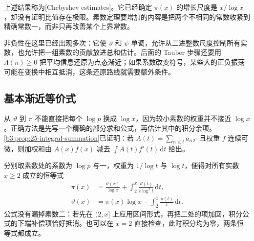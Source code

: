 上述结果称为[Chebyshev estimates]。它已经确定 \(\pi(x)\) 的增长尺度是 \(x/\log x\)，却没有证明比值存在极限。素数定理要增加的内容是把两个不相同的常数收紧到精确常数一，而非只再改善某个上界常数。

\ProseParagraphBreak

非负性在这里已经出现多次：它使 \(\vartheta\) 和 \(\psi\) 单调，允许从二进整数尺度控制所有实数，也允许把一组素数的贡献放进总和估计。后面的 Tauber 步骤还要用 \(\Lambda(n)\ge0\) 把平均信息还原为点态渐近；如果系数改变符号，某些大的正负振荡可能在变换中相互抵消，这条还原路线就需要额外条件。

\subsection{基本渐近等价式}
\label{b3:subsec:270105}

从 \(\vartheta\) 到 \(\pi\) 不能直接把每个 \(\log p\) 换成 \(\log x\)，因为较小素数的权重并不接近 \(\log x\)。正确方法是先写一个精确的部分求和公式，再估计其中的积分余项。\cref{b3:prop:25-integral-summation}已证明：若 \(A(t)=\sum_{n\le t}a_n\)，且权重 \(f\) 连续可微，则加权和由 \(A(x)f(x)\) 减去 \(\int A(t)f'(t)\,\mathrm dt\) 给出。

\ProseParagraphBreak

分别取素数处的系数为 \(\log p\) 与一，权重为 \(1/\log t\) 与 \(\log t\)，便得对所有实数 \(x\ge2\) 成立的恒等式
\begin{equation}\label{b3:eq:27-count-partial-summation}
 \begin{aligned}
  \pi(x)&=\frac{\vartheta(x)}{\log x}
       +\int_2^x\frac{\vartheta(t)}{t\log^2t}\,\mathrm dt,\\
  \vartheta(x)&=\pi(x)\log x
       -\int_2^x\frac{\pi(t)}t\,\mathrm dt.
 \end{aligned}
\end{equation}
公式没有漏掉素数二：若先在 \((2,x]\) 上应用区间形式，再把二处的项加回，积分公式的下端补偿项恰好抵消。也可以在 \(x=2\) 直接检查，此时积分均为零，两条恒等式都成立。

